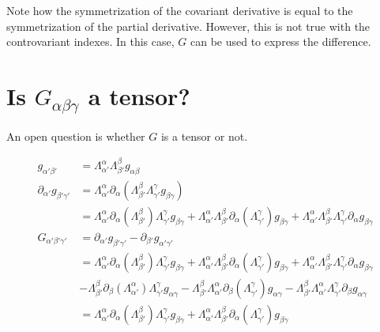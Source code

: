 \documentclass[11pt]{article}
\begin{document}
Note how the symmetrization of the covariant derivative is equal to the symmetrization of the partial derivative. However, this is not true with the controvariant indexes. In this case, $G$ can be used to express the difference.

\section{Is $G_{\alpha\beta\gamma}$ a tensor?}
An open question is whether $G$ is a tensor or not.

\begin{equation*}
	\begin{aligned}
		g_{\alpha'\beta'}&=\Lambda_{\alpha'}^{\alpha}\Lambda_{\beta'}^{\beta}g_{\alpha\beta} \\
		\partial_{\alpha'}g_{\beta'\gamma'}&=\Lambda_{\alpha'}^{\alpha}\partial_{\alpha}\left(\Lambda_{\beta'}^{\beta}\Lambda_{\gamma'}^{\gamma}g_{\beta\gamma}\right) \\
		&=\Lambda_{\alpha'}^{\alpha}\partial_{\alpha}\left(\Lambda_{\beta'}^{\beta}\right)\Lambda_{\gamma'}^{\gamma}g_{\beta\gamma} + \Lambda_{\alpha'}^{\alpha}\Lambda_{\beta'}^{\beta}\partial_{\alpha}\left(\Lambda_{\gamma'}^{\gamma}\right)g_{\beta\gamma} + \Lambda_{\alpha'}^{\alpha}\Lambda_{\beta'}^{\beta}\Lambda_{\gamma'}^{\gamma}\partial_{\alpha}g_{\beta\gamma}\\
		G_{\alpha'\beta'\gamma'} &= \partial_{\alpha'}g_{\beta'\gamma'} - \partial_{\beta'}g_{\alpha'\gamma'}\\
		&= \Lambda_{\alpha'}^{\alpha}\partial_{\alpha}\left(\Lambda_{\beta'}^{\beta}\right)\Lambda_{\gamma'}^{\gamma}g_{\beta\gamma} + \Lambda_{\alpha'}^{\alpha}\Lambda_{\beta'}^{\beta}\partial_{\alpha}\left(\Lambda_{\gamma'}^{\gamma}\right)g_{\beta\gamma} + \Lambda_{\alpha'}^{\alpha}\Lambda_{\beta'}^{\beta}\Lambda_{\gamma'}^{\gamma}\partial_{\alpha}g_{\beta\gamma}\\
		&-\Lambda_{\beta'}^{\beta}\partial_{\beta}\left(\Lambda_{\alpha'}^{\alpha}\right)\Lambda_{\gamma'}^{\gamma}g_{\alpha\gamma} - \Lambda_{\beta'}^{\beta}\Lambda_{\alpha'}^{\alpha}\partial_{\beta}\left(\Lambda_{\gamma'}^{\gamma}\right)g_{\alpha\gamma} - \Lambda_{\beta'}^{\beta}\Lambda_{\alpha'}^{\alpha}\Lambda_{\gamma'}^{\gamma}\partial_{\beta}g_{\alpha\gamma}\\
		&=\Lambda_{\alpha'}^{\alpha}\partial_{\alpha}\left(\Lambda_{\beta'}^{\beta}\right)\Lambda_{\gamma'}^{\gamma}g_{\beta\gamma} + \Lambda_{\alpha'}^{\alpha}\Lambda_{\beta'}^{\beta}\partial_{\alpha}\left(\Lambda_{\gamma'}^{\gamma}\right)g_{\beta\gamma}\\

\end{aligned}
\end{equation*}
\end{document}
